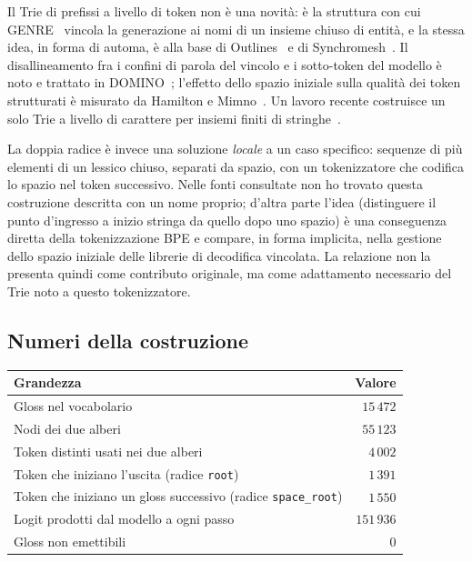 Il Trie di prefissi a livello di token non è una novità: è la struttura con cui
GENRE~\cite{decao2021genre} vincola la generazione ai nomi di un insieme chiuso
di entità, e la stessa idea, in forma di automa, è alla base di
Outlines~\cite{willard2023outlines} e di Synchromesh~\cite{poesia2022synchromesh}.
Il disallineamento fra i confini di parola del vincolo e i sotto-token del
modello è noto e trattato in DOMINO~\cite{beurerkellner2024domino}; l'effetto
dello spazio iniziale sulla qualità dei token strutturati è misurato da
Hamilton e Mimno~\cite{hamilton2025lostinspace}. Un lavoro recente costruisce un
solo Trie a livello di carattere per insiemi finiti di stringhe~\cite{xu2026trieautomata}.

La doppia radice è invece una soluzione \emph{locale} a un caso specifico:
sequenze di più elementi di un lessico chiuso, separati da spazio, con un
tokenizzatore che codifica lo spazio nel token successivo. Nelle fonti
consultate non ho trovato questa costruzione descritta con un nome proprio;
d'altra parte l'idea (distinguere il punto d'ingresso a inizio stringa da quello
dopo uno spazio) è una conseguenza diretta della tokenizzazione BPE e
compare, in forma implicita, nella gestione dello spazio iniziale delle
librerie di decodifica vincolata. La relazione non la presenta quindi come
contributo originale, ma come adattamento necessario del Trie noto a questo
tokenizzatore.

\subsection{Numeri della costruzione}

\begin{center}
\begin{tabular}{lr}
\toprule
Grandezza & Valore \\
\midrule
Gloss nel vocabolario & $15\,472$ \\
Nodi dei due alberi & $55\,123$ \\
Token distinti usati nei due alberi & $4\,002$ \\
Token che iniziano l'uscita (radice \texttt{root}) & $1\,391$ \\
Token che iniziano un gloss successivo (radice \texttt{space\_root}) & $1\,550$ \\
Logit prodotti dal modello a ogni passo & $151\,936$ \\
Gloss non emettibili & $0$ \\
\bottomrule
\end{tabular}
\end{center}

